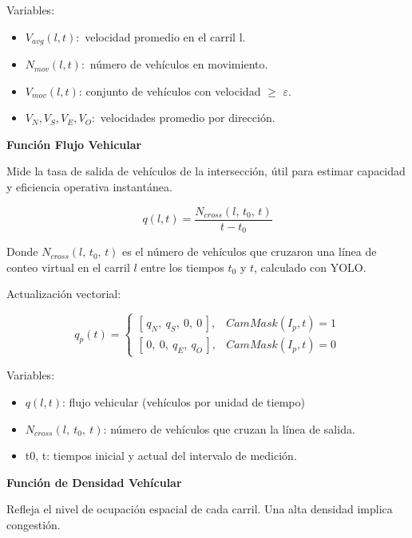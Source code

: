 \documentclass[12pt,a4paper,oneside]{report}
\begin{document}
Variables:

\begin{itemize}
\item
  \(V_{avg}(l,t):\) velocidad promedio en el carril l.
\item
  \(N_{mov}(l,t):\) número de vehículos en movimiento.
\item
  \(V_{mov}(l,t)\): conjunto de vehículos con velocidad \ensuremath{\geq} \ensuremath{\varepsilon}.
\item
  \(V_{N},V_{S},V_{E},V_{O}:\) velocidades promedio por dirección.
\end{itemize}

\textbf{Función Flujo Vehicular}

Mide la tasa de salida de vehículos de la intersección, útil para estimar capacidad y eficiencia operativa instantánea.

\begin{equation}
q(l,t) = \frac{N_{cross}(l,\,t_{0},\,t)}{t - t_{0}}
\label{eq:flujo}
\end{equation}

Donde \(N_{cross}(l,\,t_{0},\,t)\) es el número de vehículos que cruzaron una línea de conteo virtual en el carril \(l\) entre los tiempos \(t_{0}\) y \(t\), calculado con YOLO.

Actualización vectorial:

\begin{equation}
q_{p}(t) =
\begin{cases}
\left[\, q_{N},\ q_{S},\ 0,\ 0 \,\right], & CamMask(I_{p},t) = 1\\[2pt]
\left[\, 0,\ 0,\ q_{E},\ q_{O} \,\right], & CamMask(I_{p},t) = 0
\end{cases}
\end{equation}

Variables:

\begin{itemize}
\item
  \(q(l,t)\): flujo vehicular (vehículos por unidad de tiempo)
\item
  \(N_{cross}(l,\ t_{0},\ t)\): número de vehículos que cruzan la línea de salida.
\item
  t0\hspace{0pt}, t: tiempos inicial y actual del intervalo de medición.
\end{itemize}

\textbf{Función de Densidad Vehícular}

Refleja el nivel de ocupación espacial de cada carril. Una alta densidad implica congestión.
\end{document}
